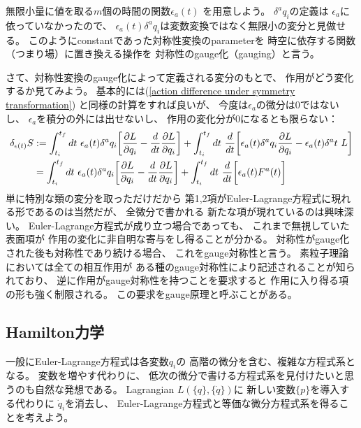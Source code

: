 無限小量に値を取る$m$個の時間の関数$\epsilon_a (t)$
を用意しよう。
$\delta^a q_i$の定義は
$\epsilon_a$に依っていなかったので、
$\epsilon_a(t) \delta^a q_i$は変数変換ではなく無限小の変分と見做せる。
このようにconstantであった対称性変換のparameterを
時空に依存する関数（つまり場）に置き換える操作を
対称性のgauge化（gauging）と言う。

さて、対称性変換のgauge化によって定義される変分のもとで、
作用がどう変化するか見てみよう。
基本的には(\ref{action difference under symmetry transformation})
と同様の計算をすれば良いが、
今度は$\epsilon_a$の微分は$0$ではないし、
$\epsilon_a$を積分の外には出せないし、
作用の変化分が$0$になるとも限らない：
\begin{align}
  \delta_{\epsilon(t)} S
  &:=
  \int_{t_i}^{t_f} dt
  \ 
  \epsilon_a(t)
  \delta^a q_i
  \bigg[
    \dfrac{\partial L}{\partial q_i}
  -
  \dfrac{d}{dt}
    \dfrac{\partial L}{\partial \dot{q}_i}
  \bigg]
  +
  \int_{t_i}^{t_f} dt
  \ 
  \dfrac{d}{dt}
  \bigg[
    \epsilon_a(t)
    \delta^a q_i
    \dfrac{\partial L}{\partial \dot{q}_i}
  -
    \epsilon_a(t)
    \delta^a t
    \ 
    L
  \bigg]
\notag\\&=
  \int_{t_i}^{t_f} dt
  \ 
  \epsilon_a(t)
  \delta^a q_i
  \bigg[
    \dfrac{\partial L}{\partial q_i}
  -
  \dfrac{d}{dt}
    \dfrac{\partial L}{\partial \dot{q}_i}
  \bigg]
  +
  \int_{t_i}^{t_f} dt
  \ 
  \dfrac{d}{dt}
  \bigg[
    \epsilon_a(t)
    F^a(t)
  \bigg]
\end{align}
単に特別な類の変分を取っただけだから
第1,2項がEuler-Lagrange方程式に現れる形であるのは当然だが、
全微分で書かれる
新たな項が現れているのは興味深い。
Euler-Lagrange方程式が成り立つ場合であっても、
これまで無視していた表面項が
作用の変化に非自明な寄与をし得ることが分かる。
対称性がgauge化された後も対称性であり続ける場合、
これをgauge対称性と言う。
素粒子理論においては全ての相互作用が
ある種のgauge対称性により記述されることが知られており、
逆に作用がgauge対称性を持つことを要求すると
作用に入り得る項の形も強く制限される。
この要求をgauge原理と呼ぶことがある。

\subsection{Hamilton力学}

一般にEuler-Lagrange方程式は各変数$q_i$の
高階の微分を含む、複雑な方程式系となる。
変数を増やす代わりに、
低次の微分で書ける方程式系を見付けたいと思うのも自然な発想である。
Lagrangian $L(\{q\},\{\dot{q}\})$に
新しい変数$\{p\}$を導入する代わりに
$\dot{q}_i$を消去し、
Euler-Lagrange方程式と等価な微分方程式系を得ることを考えよう。

